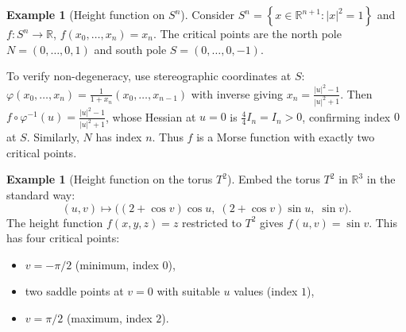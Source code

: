 \documentclass[12pt,a4paper,openany]{book}
\theoremstyle{definition}
\newtheorem{example}[theorem]{Example}
\theoremstyle{remark}
\newcommand{\R}{\mathbb{R}}
\newcommand{\abs}[1]{\left\lvert #1 \right\rvert}
\newcommand{\set}[1]{\left\{ #1 \right\}}
\begin{document}
\begin{example}[Height function on $S^n$]\label{ex:height-sphere}
Consider $S^n = \set{x \in \R^{n+1} : \abs{x}^2 = 1}$ and
$f\colon S^n \to \R$, $f(x_0,\dots,x_n) = x_n$. The critical points
are the north pole $N = (0,\dots,0,1)$ and south pole $S = (0,\dots,0,-1)$.

To verify non-degeneracy, use stereographic coordinates at $S$:
$\varphi(x_0,\dots,x_n) = \frac{1}{1+x_n}(x_0,\dots,x_{n-1})$
with inverse giving $x_n = \frac{\abs{u}^2-1}{\abs{u}^2+1}$.
Then $f\circ\varphi^{-1}(u) = \frac{\abs{u}^2-1}{\abs{u}^2+1}$,
whose Hessian at $u=0$ is $\frac{4}{4}I_n = I_n > 0$,
confirming index $0$ at $S$. Similarly, $N$ has index $n$.
Thus $f$ is a Morse function with exactly two critical points.
\end{example}

\begin{example}[Height function on the torus $T^2$]\label{ex:height-torus}
Embed the torus $T^2$ in $\R^3$ in the standard way:
\[
  (u,v) \mapsto \bigl((2+\cos v)\cos u,\;(2+\cos v)\sin u,\;\sin v\bigr).
\]
The height function $f(x,y,z) = z$ restricted to $T^2$ gives
$f(u,v) = \sin v$. This has four critical points:
\begin{itemize}
  \item $v = -\pi/2$ (minimum, index $0$),
  \item two saddle points at $v = 0$ with suitable $u$ values (index $1$),
  \item $v = \pi/2$ (maximum, index $2$).
\end{itemize}

\begin{center}
\label{fig:torus-height}
\end{center}
\end{example}
\end{document}

